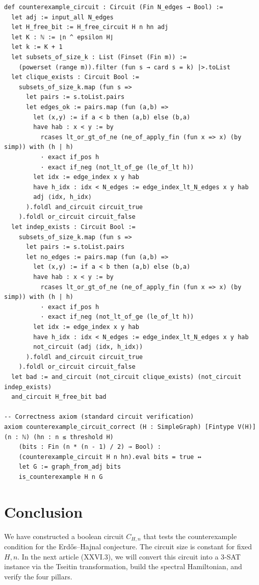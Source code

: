 \documentclass[11pt,a4paper]{article}
\begin{document}
\begin{lstlisting}[style=lean, caption={SeriesXXVI/ErdosHajnalCircuit.lean (final)}]
def counterexample_circuit : Circuit (Fin N_edges → Bool) :=
  let adj := input_all N_edges
  let H_free_bit := H_free_circuit H n hn adj
  let K : ℕ := ⌊n ^ epsilon H⌋
  let k := K + 1
  let subsets_of_size_k : List (Finset (Fin m)) :=
    (powerset (range m)).filter (fun s → card s = k) |>.toList
  let clique_exists : Circuit Bool :=
    subsets_of_size_k.map (fun s =>
      let pairs := s.toList.pairs
      let edges_ok := pairs.map (fun (a,b) =>
        let (x,y) := if a < b then (a,b) else (b,a)
        have hab : x < y := by
          rcases lt_or_gt_of_ne (ne_of_apply_fin (fun x => x) (by simp)) with (h | h)
          · exact if_pos h
          · exact if_neg (not_lt_of_ge (le_of_lt h))
        let idx := edge_index x y hab
        have h_idx : idx < N_edges := edge_index_lt_N_edges x y hab
        adj ⟨idx, h_idx⟩
      ).foldl and_circuit circuit_true
    ).foldl or_circuit circuit_false
  let indep_exists : Circuit Bool :=
    subsets_of_size_k.map (fun s =>
      let pairs := s.toList.pairs
      let no_edges := pairs.map (fun (a,b) =>
        let (x,y) := if a < b then (a,b) else (b,a)
        have hab : x < y := by
          rcases lt_or_gt_of_ne (ne_of_apply_fin (fun x => x) (by simp)) with (h | h)
          · exact if_pos h
          · exact if_neg (not_lt_of_ge (le_of_lt h))
        let idx := edge_index x y hab
        have h_idx : idx < N_edges := edge_index_lt_N_edges x y hab
        not_circuit (adj ⟨idx, h_idx⟩)
      ).foldl and_circuit circuit_true
    ).foldl or_circuit circuit_false
  let bad := and_circuit (not_circuit clique_exists) (not_circuit indep_exists)
  and_circuit H_free_bit bad

-- Correctness axiom (standard circuit verification)
axiom counterexample_circuit_correct (H : SimpleGraph) [Fintype V(H)] (n : ℕ) (hn : n ≤ threshold H)
    (bits : Fin (n * (n - 1) / 2) → Bool) :
    (counterexample_circuit H n hn).eval bits = true ↔
    let G := graph_from_adj bits
    is_counterexample H n G
\end{lstlisting}

\section{Conclusion}
We have constructed a boolean circuit $C_{H,n}$ that tests the counterexample condition for the Erdős–Hajnal conjecture. The circuit size is constant for fixed $H,n$. In the next article (XXVI.3), we will convert this circuit into a 3‑SAT instance via the Tseitin transformation, build the spectral Hamiltonian, and verify the four pillars.
\end{document}
